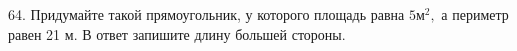 64. Придумайте такой прямоугольник, у которого площадь равна $5\text{м}^2,$ а периметр равен 21 м. В ответ запишите длину большей стороны.\\
